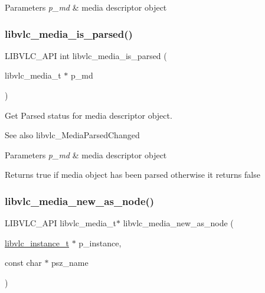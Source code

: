 \begin{DoxyParams}{Parameters}
{\em p\+\_\+md} & media descriptor object \\
\hline
\end{DoxyParams}
\mbox{\label{group__libvlc__media_ga9b8ce78027b0dadfa555fc33d2a033a6}} 
\subsubsection{\texorpdfstring{libvlc\+\_\+media\+\_\+is\+\_\+parsed()}{libvlc\_media\_is\_parsed()}}
{\footnotesize\ttfamily L\+I\+B\+V\+L\+C\+\_\+\+A\+PI int libvlc\+\_\+media\+\_\+is\+\_\+parsed (\begin{DoxyParamCaption}\item[{libvlc\+\_\+media\+\_\+t $\ast$}]{p\+\_\+md }\end{DoxyParamCaption})}

Get Parsed status for media descriptor object.

\begin{DoxySeeAlso}{See also}
libvlc\+\_\+\+Media\+Parsed\+Changed
\end{DoxySeeAlso}

\begin{DoxyParams}{Parameters}
{\em p\+\_\+md} & media descriptor object \\
\hline
\end{DoxyParams}
\begin{DoxyReturn}{Returns}
true if media object has been parsed otherwise it returns false
\end{DoxyReturn}
\mbox{\label{group__libvlc__media_ga1ccfa7815260b22adf96cc538a45fe77}} 
\subsubsection{\texorpdfstring{libvlc\+\_\+media\+\_\+new\+\_\+as\+\_\+node()}{libvlc\_media\_new\_as\_node()}}
{\footnotesize\ttfamily L\+I\+B\+V\+L\+C\+\_\+\+A\+PI libvlc\+\_\+media\+\_\+t$\ast$ libvlc\+\_\+media\+\_\+new\+\_\+as\+\_\+node (\begin{DoxyParamCaption}\item[{\hyperlink{group__libvlc__core_ga316d739a80da4678206c79f4d6c2e284}{libvlc\+\_\+instance\+\_\+t} $\ast$}]{p\+\_\+instance,  }\item[{const char $\ast$}]{psz\+\_\+name }\end{DoxyParamCaption})}

